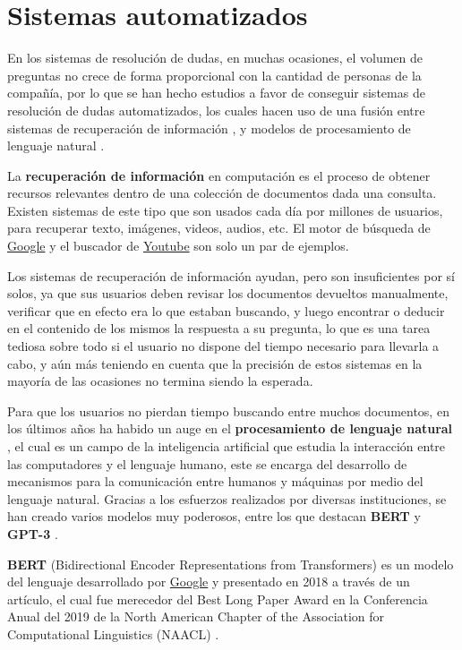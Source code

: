 \section{Sistemas automatizados}

En los sistemas de resolución de dudas, en muchas ocasiones, el volumen de preguntas no crece de forma proporcional con la cantidad de personas de la compañía, por lo que se han hecho estudios a favor de conseguir sistemas de resolución de dudas automatizados, los cuales hacen uso de una fusión entre sistemas de recuperación de información \cite{ir}, y modelos de procesamiento de lenguaje natural \cite{nlp}.
\newline

La \textbf{recuperación de información} \cite{ir} en computación es el proceso de obtener recursos relevantes dentro de una colección de documentos dada una consulta. Existen sistemas de este tipo que son usados cada día por millones de usuarios, para recuperar texto, imágenes, videos, audios, etc. El motor de búsqueda de \href{google.com}{Google} y el buscador de \href{youtube.com}{Youtube} son solo un par de ejemplos.
\newline

Los sistemas de recuperación de información ayudan, pero son insuficientes por sí solos, ya que sus usuarios deben revisar los documentos devueltos manualmente, verificar que en efecto era lo que estaban buscando, y luego encontrar o deducir en el contenido de los mismos la respuesta a su pregunta, lo que es una tarea tediosa sobre todo si el usuario no dispone del tiempo necesario para llevarla a cabo, y aún más teniendo en cuenta que la precisión de estos sistemas en la mayoría de las ocasiones no termina siendo la esperada.
\newline

Para que los usuarios no pierdan tiempo buscando entre muchos documentos, en los últimos años ha habido un auge en el \textbf{procesamiento de lenguaje natural} \cite{nlp}, el cual es un campo de la inteligencia artificial que estudia la interacción entre las computadores y el lenguaje humano, este se encarga del desarrollo de mecanismos para la comunicación entre humanos y máquinas por medio del lenguaje natural. Gracias a los esfuerzos realizados por diversas instituciones, se han creado varios modelos muy poderosos, entre los que destacan \textbf{BERT} \cite{bert} y \textbf{GPT-3} \cite{gpt}.
\newline

\textbf{BERT} (Bidirectional Encoder Representations from Transformers) es un modelo del lenguaje desarrollado por \href{google.com}{Google} y presentado en 2018 a través de un artículo, el cual fue merecedor del Best Long Paper
Award en la Conferencia Anual del 2019 de la North American Chapter of the Association for Computational Linguistics (NAACL) \cite{bert_award}.
\newline

